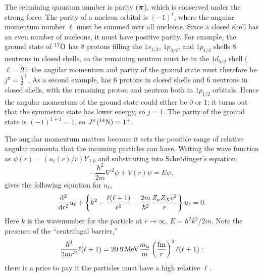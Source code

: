The remaining quantum number is parity ($\bvec{\pi}$), which is conserved under the strong force. The parity of a nucleon orbital is $(-1)^{\ell}$, where the angular momentum number $\ell$ must be summed over all nucleons. Since a closed shell has an even number of nucleons, it must have positive parity. For example, the ground state of $\oxygen[17]$ has 8 protons filling the $1s_{1/2}$, $1p_{3/2}$, and $1p_{1/2}$ shells 8 neutrons in closed shells, so the remaining neutron must be in the  $1d_{5/2}$ shell ($\ell=2$): the angular momentum and parity of the ground state must therefore be $j^{\pi} = \frac{5}{2}^{+}$. As a second example, \nitrogen has 6 protons in closed shells and 6 neutrons in closed shells, with the remaining proton and neutron both in $1p_{1/2}$ orbitals.  Hence the angular momentum of the ground state could either be $0$ or $1$; it turns out that the symmetric state has lower energy, so $j=1$. The parity of the ground state is $(-1)^{1 + 1} = 1$, so $J^{\pi}( \nitrogen) = 1^{+}$.

The angular momentum matters because it sets the possible range of relative angular momenta that the incoming particles can have.  Writing the wave function as $\psi(r) = (u_{\ell}(r)/r)Y_{\ell 0}$ and substituting  into Schr\"odinger's equation,
\[
-\frac{\hbar^{2}}{2m}\nabla^{2}\psi + V(r)\psi  = E\psi,
\]
gives the following equation for $u_{\ell}$,
\[
\frac{\dif^{2}}{\dif r^{2}} u_{\ell} + \left\{ k^{2} - \frac{\ell(\ell + 1)}{r^{2}} - \frac{2m}{\hbar^{2}}\frac{Z_{a}Z_{X}e^{2}}{r} \right\}u_{\ell} = 0.
\]
Here $k$ is the wavenumber for the particle at $r\to\infty$, $E = \hbar^{2}k^{2}/2m$. Note the presence of the ``centrifugal barrier,''
\[ \frac{\hbar^{2}}{2mr^{2}} \ell(\ell+1)  = 20.9\nsp\MeV\frac{\mb}{m}\left(\frac{\fermi}{r}\right)^{2}\ell(\ell+1): \]
there is a price to pay if the particles must have a high relative $\ell$.


